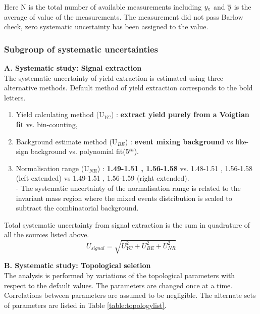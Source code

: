 Here N is the total number of available measurements including $\it{y}_{c}$ and $\overline{\it{y}}$ is the average of value of the measurements. The measurement did not pass Barlow check, zero systematic uncertainty has been assigned to the value. \\

\subsubsection{Subgroup of systematic uncertainties}\label{sec:pPb:subsys} 
\textbf{A. Systematic study: Signal extraction}\\
The systematic uncertainty of yield extraction is estimated using three alternative methods. Default method of yield extraction corresponds to the bold letters. 

\begin{enumerate}
\item Yield calculating method (U$_{YC}$) : \textbf{extract yield purely from a Voigtian fit } vs. bin-counting, \item Background estimate method (U$_{BE}$) : \textbf{event mixing background} vs like-sign background  vs. polynomial fit(5$^{th}$). 
\item Normalisation range (U$_{NR}$) :  \textbf{1.49-1.51 , 1.56-1.58}  vs. 1.48-1.51 , 1.56-1.58 (left extended) vs 1.49-1.51 , 1.56-1.59 (right extended). \\
 - The systematic uncertainty of the normalisation range is related to the invariant mass region where the mixed events distribution is scaled to subtract the combinatorial background. 
 \end{enumerate}
Total systematic uncertainty from signal extraction is the sum in quadrature of all the sources listed above.
\begin{equation}
U_{signal} = \sqrt{U_{YC}^{2} + U_{BE}^2 + U_{NR}^2}
\end{equation}

\textbf{B. Systematic study: Topological seletion}\\
The analysis is performed by variations of the topological parameters with respect to the default values. The parameters are changed once at a time. Correlations between parameters are assumed to be negligible. The alternate sets of parameters are listed in Table \ref{table:topologylist}.

